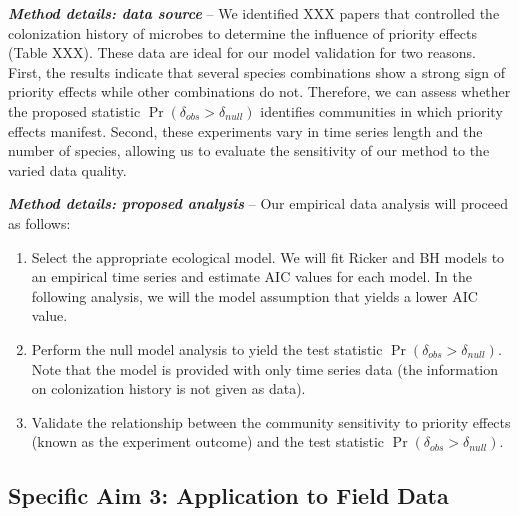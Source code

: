 \documentclass[12pt, class=article, crop=false]{standalone}
\begin{document}
\textit{\textbf{Method details: data source}} --
We identified XXX papers that controlled the colonization history of microbes to determine the influence of priority effects (Table XXX).
These data are ideal for our model validation for two reasons. First, the results indicate that several species combinations show a strong sign of priority effects while other combinations do not.
Therefore, we can assess whether the proposed statistic $\Pr(\delta_{obs} > \delta_{null})$ identifies communities in which priority effects manifest.
Second, these experiments vary in time series length and the number of species, allowing us to evaluate the sensitivity of our method to the varied data quality.

\textit{\textbf{Method details: proposed analysis}} --
Our empirical data analysis will proceed as follows:

\begin{enumerate}
    \item Select the appropriate ecological model.
    We will fit Ricker and BH models to an empirical time series and estimate AIC values for each model.
    In the following analysis, we will the model assumption that yields a lower AIC value.
    \item Perform the null model analysis to yield the test statistic $\Pr(\delta_{obs} > \delta_{null})$.
    Note that the model is provided with only time series data (the information on colonization history is not given as data).
    \item Validate the relationship between the community sensitivity to priority effects (known as the experiment outcome) and the test statistic $\Pr(\delta_{obs} > \delta_{null})$.
\end{enumerate}

\subsection*{Specific Aim 3: Application to Field Data}
\end{document}
